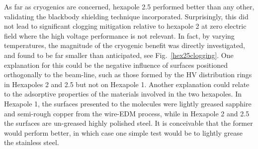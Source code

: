 As far as cryogenics are concerned, hexapole 2.5 performed better than any other, validating the blackbody shielding technique incorporated.
Surprisingly, this did not lead to significant clogging mitigation relative to hexapole 2 at zero electric field where the high voltage performance is not relevant.
In fact, by varying temperatures, the magnitude of the cryogenic benefit was directly investigated, and found to be far smaller than anticipated, see Fig.~\ref{hex25clogging}.
One explanation for this could be the negative influence of surfaces positioned orthogonally to the beam-line, such as those formed by the HV distribution rings in Hexapoles 2 and 2.5 but not on Hexapole 1.
Another explanation could relate to the adsorptive properties of the materials involved in the two hexapoles.
In Hexapole 1, the surfaces presented to the molecules were lightly greased sapphire and semi-rough copper from the wire-EDM process, while in Hexapole 2 and 2.5 the surfaces are un-greased highly polished steel.
It is conceivable that the former would perform better, in which case one simple test would be to lightly grease the stainless steel.



